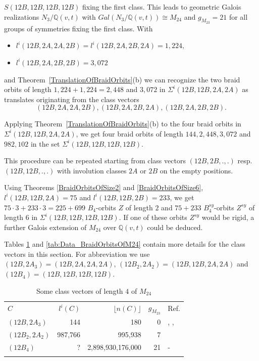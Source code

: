 \documentclass[12pt,a4paper]{article}
\numberwithin{equation}{section}
\numberwithin{table}{section}
\begin{document}
\par
\noindent
$S(12B,12B,12B,12B)$ fixing the first class.
This leads to geometric Galois realizations 
$N_3/\mathbb{Q}(v,t)$ with $Gal(N_3/\mathbb{Q}(v,t)) \cong M_{24}$ and $g_{M_{23}}=21$
for all groups of symmetries fixing the first class.
With 
\begin{itemize}
\item[]
$l^i(12B,2A,2A,2B)=l^i(12B,2A,2B,2A)=1,224,$
\item[]
$l^i(12B,2A,2B,2B)=3,072$
\end{itemize}
and Theorem~\ref{TranslationOfBraidOrbits}(b) we can recognize
the two braid orbits of length $1,224+1,224=2,448$ and $3,072$ in $\Sigma^i(12B,12B,2A,2A)$ as translates
originating from the class vectors 
$$(12B,2A,2A,2B),(12B,2A,2B,2A),(12B,2A,2B,2B).$$
\par
\noindent
Applying Theorem~\ref{TranslationOfBraidOrbits}(b) to the four braid orbits in $\Sigma^i(12B,12B,2A,2A)$, we get four
braid orbits of length $144, 2,448, 3,072$ and $982,102$ in the set $\Sigma^i(12B,12B,12B,12B)$.
\par
\noindent
This procedure can be repeated starting from class vectors $(12B,2B,.,.)$ resp. $(12B,12B,.,.)$ with involution classes
$2A$ or $2B$ on the empty positions.
\par
\noindent
Using Theorems \ref{BraidOrbitsOfSize2} and \ref{BraidOrbitsOfSize6}, $l^i(12B,12B,2A)=75$ and $l^i(12B,12B,2B)=233$,
we get $75 \cdot 3 + 233 \cdot 3 = 225+699$ $B_4$-orbits $Z$ of length $2$ 
and $75+233$ $B^{sy}_4$-orbits $Z^{sy}$ of length $6$ in $\Sigma^i(12B,12B,12B,12B)$.
If one of these orbits $Z^{sy}$ would be rigid, a further Galois extension 
of $M_{24}$ over $\mathbb{Q}(v,t)$ could be deduced.
\par
\noindent
Tables \ref{tab:Data_4DimClassvectorsM24} and \ref{tab:Data_BraidOrbitsOfM24} contain more details for the
class vectors in this section.
For abbreviation we use $(12B,2A_3)=(12B,2A,2A,2A)$, $(12B_2,2A_2)=(12B,12B,2A,2A)$ and $(12B_4)=(12B,12B,12B,12B)$.
%
\begin{table}[!htbp]
\centering
\footnotesize
\captionsetup{font=footnotesize}
\caption{Some class vectors of length $4$ of $M_{24}$}
\label{tab:Data_4DimClassvectorsM24}
\begin{tabular}{lrrrl}
\hline\noalign{\smallskip}
$C$ & $l^i(C)$ & $\lfloor n(C) \rfloor$ & $g_{M_{23}}$ & Ref.\\
\noalign{\smallskip}\hline\noalign{\smallskip}
$(12B,2A_3)$ & 144 & 180 & 0 & \cite{RefHae1987}, \cite{RefHae1991}, \cite{RefMat1991}\\
$(12B_2,2A_2)$ & 987,766 & 995,938 & 7 & \cite{RefHae1991}\\
$(12B_4)$ & ? & 2,898,930,176,000 & 21 & -\\
\noalign{\smallskip}\hline
\end{tabular}
\end{table}
\end{document}
